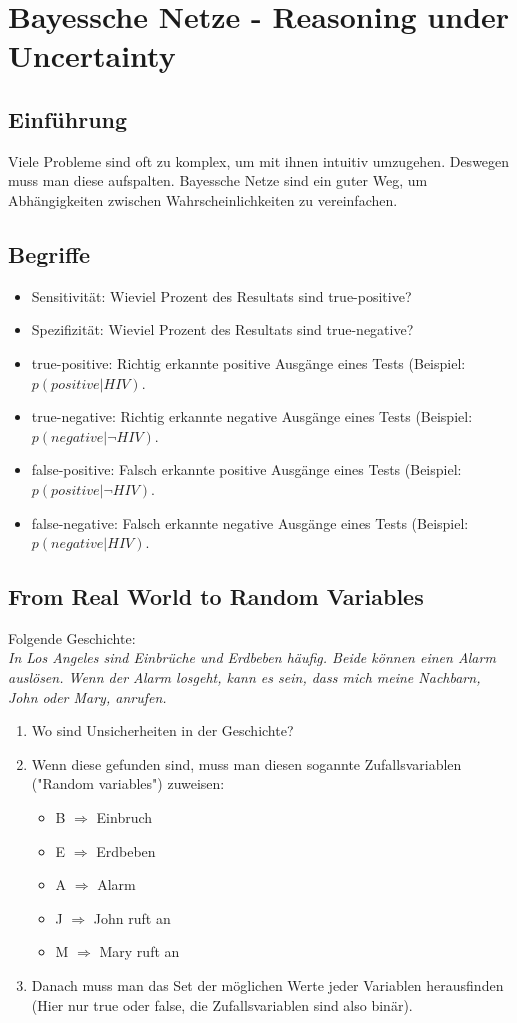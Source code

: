 \chapter{Bayessche Netze - Reasoning under Uncertainty}
\section{Einführung}
Viele Probleme sind oft zu komplex, um mit ihnen intuitiv umzugehen. Deswegen muss man diese aufspalten. Bayessche Netze sind ein guter Weg, um Abhängigkeiten zwischen Wahrscheinlichkeiten zu vereinfachen.

\section{Begriffe}
\begin{itemize}
\item Sensitivität: Wieviel Prozent des Resultats sind true-positive?
\item Spezifizität: Wieviel Prozent des Resultats sind true-negative?
\item true-positive: Richtig erkannte positive Ausgänge eines Tests (Beispiel: $p(positive | HIV)$.
\item true-negative: Richtig erkannte negative Ausgänge eines Tests (Beispiel: $p(negative | \neg HIV)$.
\item false-positive: Falsch erkannte positive Ausgänge eines Tests (Beispiel: $p(positive | \neg HIV)$.
\item false-negative: Falsch erkannte negative Ausgänge eines Tests (Beispiel: $p(negative | HIV)$.
\end{itemize}

\section{From Real World to Random Variables}
Folgende Geschichte:\\
\textit{In Los Angeles sind Einbrüche und Erdbeben häufig. Beide können einen Alarm auslösen. Wenn der Alarm losgeht, kann es sein, dass mich meine Nachbarn, John oder Mary, anrufen.}

\begin{enumerate}
\item Wo sind Unsicherheiten in der Geschichte?
\item Wenn diese gefunden sind, muss man diesen sogannte Zufallsvariablen ("Random variables") zuweisen:
\begin{itemize}
\item B $\Rightarrow$ Einbruch
\item E $\Rightarrow$ Erdbeben
\item A $\Rightarrow$ Alarm
\item J $\Rightarrow$ John ruft an
\item M $\Rightarrow$ Mary ruft an
\end{itemize}
\item Danach muss man das Set der möglichen Werte jeder Variablen herausfinden (Hier nur true oder false, die Zufallsvariablen sind also binär).
\end{enumerate}


